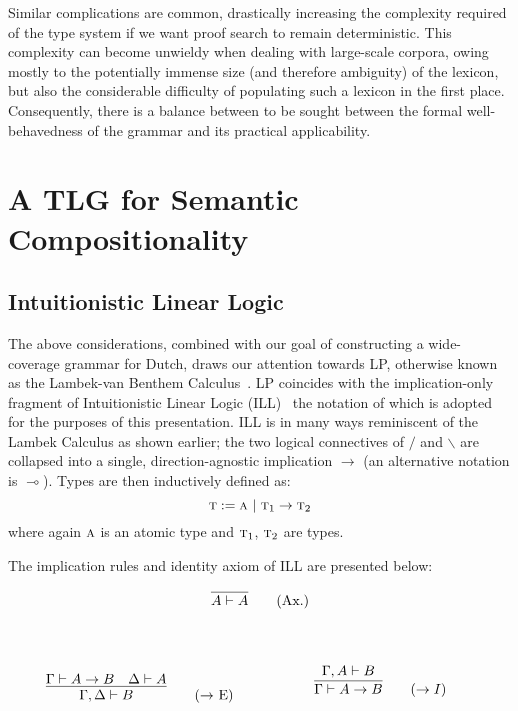 Similar complications are common, drastically increasing the complexity required of the type system if we want proof search to remain deterministic.
This complexity can become unwieldy when dealing with large-scale corpora, owing mostly to the potentially immense size (and therefore ambiguity) of the lexicon, but also the considerable difficulty of populating such a lexicon in the first place.
Consequently, there is a balance between to be sought between the formal well-behavedness of the grammar and its practical applicability.



\section{A TLG for Semantic Compositionality}
\subsection{Intuitionistic Linear Logic}
The above considerations, combined with our goal of constructing a wide-coverage grammar for Dutch, draws our attention towards LP, otherwise known as the Lambek-van Benthem Calculus~\cite{van1988semantics}.
LP coincides with the implication-only fragment of Intuitionistic Linear Logic (ILL)~\cite{girard1987linear} the notation of which is adopted for the purposes of this presentation.
ILL is in many ways reminiscent of the Lambek Calculus as shown earlier; the two logical connectives of $/$ and $\backslash$ are collapsed into a single, direction-agnostic implication $\rightarrow$ (an alternative notation is $\multimap$).
Types are then inductively defined as:
\[
\textsc{t} := \textsc{a} \ | \ \textsc{t}_1 \to \textsc{t}_2 
\]
where again $\textsc{a}$ is an atomic type and $\textsc{t}_1$, $\textsc{t}_2$ are types.

The implication rules and identity axiom of ILL are presented below:

\begin{center}
\begin{minipage}{0.5\textwidth}
\[
\infer{A \vdash A}{}\tag{Ax.}
\]
\end{minipage}\\
\end{center}
\begin{align*}
    \begin{minipage}{0.5\textwidth}
	\[
        \infer{\Gamma, \Delta \vdash B}{
            \Gamma \vdash A \rightarrow B
            &
            \Delta \vdash A
        }\tag{$\rightarrow$ E}
    \]
    \end{minipage}
    \begin{minipage}{0.5\textwidth}
    \[
        \infer{\Gamma \vdash A \rightarrow B}{
            \Gamma, A \vdash B
        }\tag{$\rightarrow I$}\\
    \]
    \end{minipage}
\end{align*}

